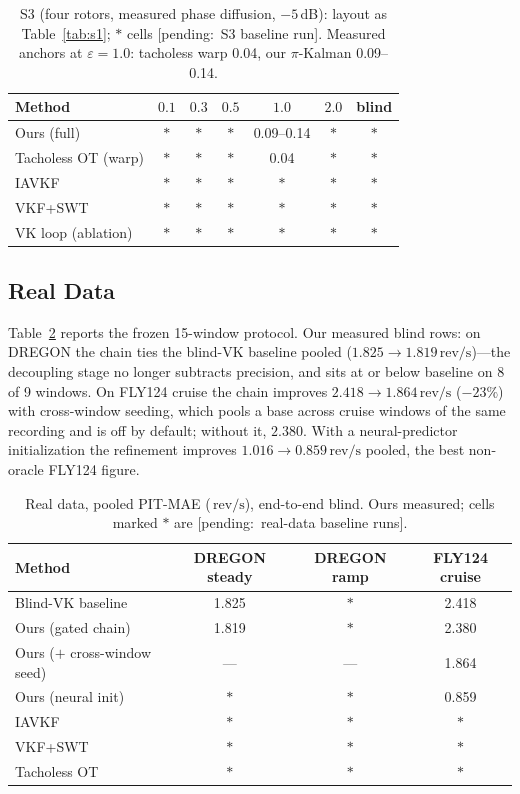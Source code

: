 \documentclass[journal]{IEEEtran}
\newcommand{\revps}{\ensuremath{\,\mathrm{rev/s}}}
\newcommand{\pending}[1]{{\color{gray}\textsf{[pending:~#1]}}}
\begin{document}
\begin{table}[t]
  \centering
  \caption{S3 (four rotors, measured phase diffusion, $-5$\,dB): layout
    as Table~\ref{tab:s1}; $\ast$ cells \pending{S3 baseline run}. Measured anchors at $\varepsilon = 1.0$:
    tacholess warp 0.04, our $\pi$-Kalman 0.09--0.14.}
  \label{tab:s3}
  \scriptsize
  \setlength{\tabcolsep}{3pt}
  \newcommand{\pd}{{\color{gray}$\ast$}}
  \begin{tabular}{@{}lcccccc@{}}
    \toprule
    Method & $0.1$ & $0.3$ & $0.5$ & $1.0$ & $2.0$ & blind \\
    \midrule
    Ours (full) & \pd & \pd & \pd & 0.09--0.14 & \pd & \pd \\
    Tacholess OT (warp) & \pd & \pd & \pd & 0.04 & \pd & \pd \\
    IAVKF & \pd & \pd & \pd & \pd & \pd & \pd \\
    VKF+SWT & \pd & \pd & \pd & \pd & \pd & \pd \\
    VK loop (ablation) & \pd & \pd & \pd & \pd & \pd & \pd \\
    \bottomrule
  \end{tabular}
\end{table}

\subsection{Real Data}

Table~\ref{tab:real} reports the frozen 15-window protocol. Our measured
blind rows: on DREGON the chain ties the blind-VK baseline pooled ($1.825
\to 1.819\revps$)---the decoupling stage no longer subtracts precision,
and sits at or below baseline on 8 of 9 windows. On FLY124 cruise the
chain improves $2.418 \to 1.864\revps$ ($-23\%$) with cross-window
seeding, which pools a base across cruise windows of the same recording
and is off by default; without it, $2.380$. With a neural-predictor
initialization the refinement improves $1.016 \to 0.859\revps$ pooled,
the best non-oracle FLY124 figure.

\begin{table}[t]
  \centering
  \caption{Real data, pooled PIT-MAE (\revps), end-to-end blind. Ours
    measured; cells marked $\ast$ are \pending{real-data baseline runs}.}
  \label{tab:real}
  \scriptsize
  \setlength{\tabcolsep}{3pt}
  \newcommand{\pd}{{\color{gray}$\ast$}}
  \begin{tabular}{@{}lccc@{}}
    \toprule
    Method & DREGON steady & DREGON ramp & FLY124 cruise \\
    \midrule
    Blind-VK baseline & 1.825 & \pd & 2.418 \\
    Ours (gated chain) & 1.819 & \pd & 2.380 \\
    Ours ($+$ cross-window seed) & --- & --- & 1.864 \\
    Ours (neural init) & \pd & \pd & 0.859 \\
    IAVKF & \pd & \pd & \pd \\
    VKF+SWT & \pd & \pd & \pd \\
    Tacholess OT & \pd & \pd & \pd \\
    \bottomrule
  \end{tabular}
\end{table}
\end{document}

